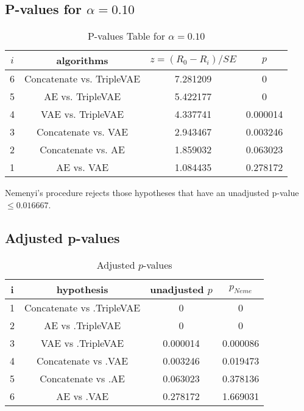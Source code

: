 \documentclass[a4paper,10pt]{article}
\begin{document}
\begin{landscape}
\pagebreak

\subsection{P-values for $\alpha=0.10$}

\begin{table}[!htp]
\centering\scriptsize
\begin{tabular}{cccc}
$i$&algorithms&$z=(R_0 - R_i)/SE$&$p$\\
\hline6&Concatenate vs. TripleVAE&7.281209&0\\
5&AE vs. TripleVAE&5.422177&0\\
4&VAE vs. TripleVAE&4.337741&0.000014\\
3&Concatenate vs. VAE&2.943467&0.003246\\
2&Concatenate vs. AE&1.859032&0.063023\\
1&AE vs. VAE&1.084435&0.278172\\
\hline
\end{tabular}
\caption{P-values Table for $\alpha=0.10$}
\end{table}Nemenyi's procedure rejects those hypotheses that have an unadjusted p-value $\le0.016667$.

\pagebreak

\subsection{Adjusted p-values}

\begin{table}[!htp]
\centering\scriptsize
\begin{tabular}{cccc}
i&hypothesis&unadjusted $p$&$p_{Neme}$\\
\hline1&Concatenate vs .TripleVAE&0&0\\
2&AE vs .TripleVAE&0&0\\
3&VAE vs .TripleVAE&0.000014&0.000086\\
4&Concatenate vs .VAE&0.003246&0.019473\\
5&Concatenate vs .AE&0.063023&0.378136\\
6&AE vs .VAE&0.278172&1.669031\\
\hline
\end{tabular}
\caption{Adjusted $p$-values}
\end{table}

\end{landscape}
\end{document}
